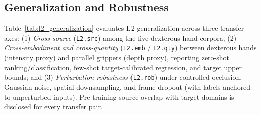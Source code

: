 \begin{table}[t]
\centering
\small
\setlength{\tabcolsep}{4pt}
\caption{L1 Frozen Readability results across projected readout (Proj), $k$-NN, and attentive (Attn) probes. L1a evaluates UV contact proxy trends; L1b physical force (N) is reported only on externally verified wrench subsets.}
\label{tab:l1_readability}
\end{table}

\subsection{Generalization and Robustness}
\label{sec:exp_l2}
Table~\ref{tab:l2_generalization} evaluates L2 generalization across three transfer axes:
(1) \emph{Cross-source} (\texttt{L2.src}) among the five dexterous-hand corpora;
(2) \emph{Cross-embodiment and cross-quantity} (\texttt{L2.emb} / \texttt{L2.qty}) between dexterous hands (intensity proxy) and parallel grippers (depth proxy), reporting zero-shot ranking/classification, few-shot target-calibrated regression, and target upper bounds; and
(3) \emph{Perturbation robustness} (\texttt{L2.rob}) under controlled occlusion, Gaussian noise, spatial downsampling, and frame dropout (with labels anchored to unperturbed inputs).
Pre-training source overlap with target domains is disclosed for every transfer pair.

